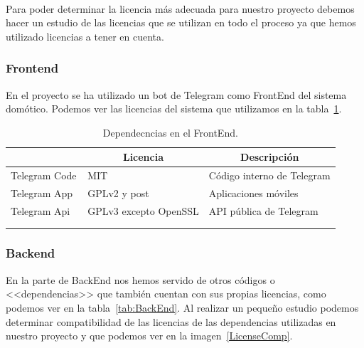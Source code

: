 \begin{displayquote}
~\cite{misc:WikiLicencia}
\end{displayquote}

Para poder determinar la licencia más adecuada para nuestro proyecto debemos hacer un estudio de las licencias que se utilizan en todo el proceso ya que hemos utilizado licencias a tener en cuenta.

\subsubsection{Frontend}
En el proyecto se ha utilizado un bot de Telegram como FrontEnd del sistema domótico. Podemos ver las licencias del sistema que utilizamos en la tabla~\ref{tab:FrontEnd}.

\begin{longtable}[c]{@{}lll@{}}
\toprule
\centering
\multicolumn{1}{c}{\textbf{Nombre}} & \multicolumn{1}{c}{\textbf{Licencia}} & \multicolumn{1}{c}{\textbf{Descripción}} \\ \midrule
\endfirsthead
%
\endhead
%
\bottomrule
\endfoot
%
\endlastfoot
%
Telegram Code & MIT & Código interno de Telegram \\
Telegram App~\cite{misc:TelegramApp} & GPLv2 y post & Aplicaciones móviles \\
Telegram Api~\cite{misc:TelegramApi} & GPLv3 excepto OpenSSL & API pública de Telegram \\ \bottomrule \\
\caption{Dependecncias en el FrontEnd.}
\label{tab:FrontEnd}
\end{longtable}

\subsubsection{Backend}
En la parte de BackEnd nos hemos servido de otros códigos o <<dependencias>> que también cuentan con sus propias licencias, como podemos ver en la tabla~\ref{tab:BackEnd}. Al realizar un pequeño estudio podemos determinar compatibilidad de las licencias de las dependencias utilizadas en nuestro proyecto y que podemos ver en la imagen~\ref{LicenseComp}.

